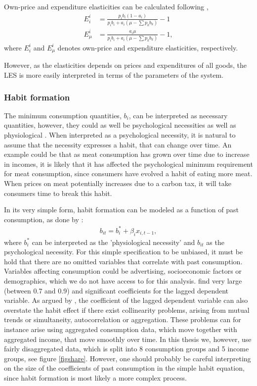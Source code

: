 Own-price and expenditure elasticities can be calculated following \cite{pollak1992demand},
\begin{align}
    E_{i}^i &= \frac{p_i b_{i} (1-a_i)}{p_i b_i + a_i(\mu-\sum p_k b_k)}-1 \\
    E_{\mu}^i &= \frac{a_i \mu}{p_i b_i + a_i(\mu-\sum p_k b_k)}-1,
\end{align}
where $E_{i}^i$ and $E_{\mu}^i$ denotes own-price and expenditure elasticities, respectively.

However, as the elasticities depends on prices and expenditures of all goods, the LES is more easily interpreted in terms of the parameters of the system.

\subsubsection{Habit formation}\label{sec:habit_formation}

The minimum consumption quantities, $b_i$, can be interpreted as necessary quantities, however, they could as well be psychological necessities as well as physiological \citep{pollak1992demand}. When interpreted as a psychological necessity, it is natural to assume that the necessity expresses a habit, that can change over time. An example could be that as meat consumption has grown over time due to increase in incomes, it is likely that it has affected the psychological minimum requirement for meat consumption, since consumers have evolved a habit of eating more meat. When prices on meat potentially increases due to a carbon tax, it will take consumers time to break this habit.

In its very simple form, habit formation can be modeled as a function of past consumption, as done by \cite{pollak1992demand}:
\begin{align}
    b_{it} = b_i^* + \beta_i x_{i,t-1},
\end{align}
where $b_i^*$ can be interpreted as the 'physiological necessity' and $ b_{it}$ as the psychological necessity. For this simple specification to be unbiased, it must be hold that there are no omitted variables that correlate with past consumption. Variables affecting consumption could be advertising, socioeconomic factors or demographics, which we do not have access to for this analysis. \cite{pollak1992demand} find very large (between 0.7 and 0.9) and significant coefficients for the lagged dependent variable. As argued by \cite{test_habit}, the coefficient of the lagged dependent variable can also overstate the habit effect if there exist collinearity problems, arising from mutual trends or simultaneity, autocorrelation or aggregation. These problems can for instance arise using aggregated consumption data, which move together with aggregated income, that move smoothly over time. In this thesis we, however, use fairly disaggregated data, which is split into 8 consumption groups and 5 income groups, see figure \ref{figshare}. However, one should probably be careful interpreting on the size of the coefficients of past consumption in the simple habit equation, since habit formation is most likely a more complex process.

